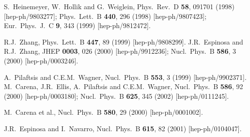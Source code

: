 \documentclass[11pt]{article}
\begin{document}
\begin{thebibliography}{999}
S.~Heinemeyer, W.~Hollik and G.~Weiglein,
  Phys.\ Rev.\ D {\bf 58}, 091701 (1998)
  [hep-ph/9803277];
  Phys.\ Lett.\ B {\bf 440}, 296 (1998)
  [hep-ph/9807423];
  Eur.\ Phys.\ J.\ C {\bf 9}, 343 (1999)
  [hep-ph/9812472].

R.J.~Zhang,
  Phys.\ Lett.\ B {\bf 447}, 89 (1999)
  [hep-ph/9808299].
J.R.~Espinosa and R.J.~Zhang,
  JHEP {\bf 0003}, 026 (2000)
  [hep-ph/9912236];
  Nucl.\ Phys.\ B {\bf 586}, 3 (2000)
  [hep-ph/0003246].

A.~Pilaftsis and C.E.M.~Wagner,
  Nucl.\ Phys.\ B {\bf 553}, 3 (1999)
  [hep-ph/9902371].
M.~Carena, J.R.~Ellis, A.~Pilaftsis and C.E.M.~Wagner,
  Nucl.\ Phys.\ B {\bf 586}, 92 (2000)
  [hep-ph/0003180];
  Nucl.\ Phys.\ B {\bf 625}, 345 (2002)
  [hep-ph/0111245].

M.~Carena et al.,
  Nucl.\ Phys.\ B {\bf 580}, 29 (2000)
  [hep-ph/0001002].

J.R.~Espinosa and I.~Navarro,
  Nucl.\ Phys.\ B {\bf 615}, 82 (2001)
  [hep-ph/0104047].


\end{thebibliography}
\end{document}
